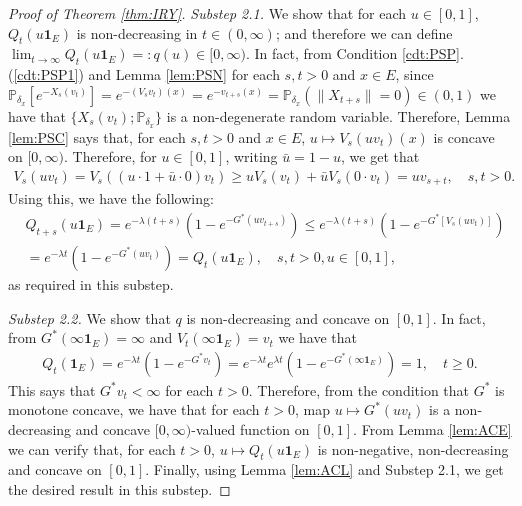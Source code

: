 \documentclass[12pt,a4paper]{amsart}
\numberwithin{equation}{section}
\theoremstyle{plain}
\theoremstyle{definition}
\begin{document}
\begin{proof}[Proof of Theorem \ref{thm:IRY}]
\emph{Substep 2.1.} We show that for each $u \in [0,1]$, $Q_t(u \mathbf 1_E)$ is non-decreasing in $t\in (0,\infty)$; and therefore we can define $\lim_{t\to \infty} Q_t(u \mathbf 1_E)=:q(u)\in [0,\infty)$.
In fact, from Condition \ref{cdt:PSP}.(\ref{cdt:PSP1}) and  Lemma \ref{lem:PSN} for each $s,t> 0$ and $x\in E$, since $\mathbb P_{\delta_x} [e^{-X_s (v_t)}] = e^{- (V_s v_t) (x)} = e^{-v_{t+s}(x)} = \mathbb P_{\delta_x}(\|X_{t+s}\| = 0) \in (0, 1)$ we have that $\{X_s(v_t); \mathbb P_{\delta_x}\}$ is a non-degenerate random variable.
Therefore, Lemma \ref{lem:PSC} says that, for each $s,t > 0$ and $x\in E$, $u\mapsto V_s(uv_t)(x)$ is concave on $[0,\infty)$. 
Therefore, for $u\in [0,1]$, writing $\bar u = 1- u$, we get that
\begin{align}
	V_s(uv_t)
  =V_s((u\cdot 1 + \bar u \cdot 0)v_t) 
  \geq uV_s(v_t) + \bar u V_s(0\cdot v_t) 
  = uv_{s+t},
  \quad s,t > 0.
\end{align} 
Using this, we have the following: 
\begin{align}
  & Q_{t+s}(u\mathbf 1_E) 
    = e^{- \lambda (t+s)} ( 1-e^{-G^*(uv_{t+s})} ) 
  \leq e^{- \lambda(t+s)}( 1-e^{-G^*[V_s(uv_t)]} ) \\
  & = e^{-\lambda t}( 1-e^{-G^*(uv_t)} )
    = Q_t(u\mathbf 1_E)
  , \quad s,t > 0, u \in [0,1],
\end{align}
as required in this substep.

\emph{Substep 2.2.}
We show that $q$ is non-decreasing and concave on $[0,1]$.
In fact, from $G^*(\infty \mathbf 1_E) = \infty$ and $V_t(\infty \mathbf 1_E) = v_t$ we have that
\begin{align}
  \label{eq:MY3}
	Q_t(\mathbf 1_E) = e^{- \lambda t} ( 1-e^{-G^*v_t} )
  = e^{- \lambda t} e^{\lambda t}( 1-e^{-G^*(\infty\mathbf 1_E)} )
  = 1,
  \quad t\geq 0.
\end{align}
This says that $G^*v_t < \infty$ for each $t>0$. 
Therefore, from the condition that $G^*$ is monotone concave, we have that for each $t>0$, map $u \mapsto G^*(uv_t)$ is a non-decreasing and concave $[0,\infty)$-valued function on $[0,1]$.
From Lemma \ref{lem:ACE} we can verify that, for each $t> 0$, $u \mapsto Q_t(u \mathbf 1_E)$ is non-negative, non-decreasing and concave on $[0,1]$.
Finally, using Lemma \ref{lem:ACL} and Substep 2.1, we get the desired result in this substep. 


\end{proof}
\end{document}

